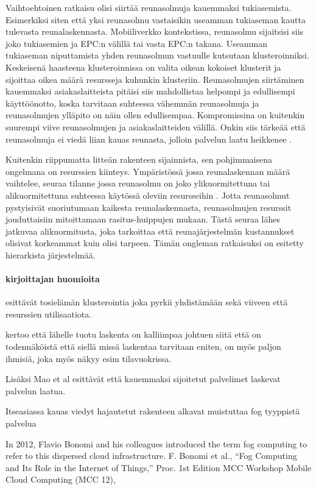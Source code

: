 Vaihtoehtoinen ratkaisu olisi siirtää reunasolmuja kauemmaksi tukiasemista. Esimerkiksi siten että yksi reunasolmu vastaisikin useamman tukiaseman kautta tulevasta reunalaskennasta. Mobiiliverkko kontekstissa, reunasolmu sijaitsisi siis joko tukiasemien ja EPC:n välillä tai vasta EPC:n takana.  
Useamman tukiaseman niputtamista yhden reunasolmun vastuulle kutsutaan klusteroinniksi. 
Keskeisenä haasteena klusteroinnissa on valita oikean kokoiset klusterit ja sijoittaa oikea määrä resursseja kuhunkin klusteriin.
Reunasolmujen siirtäminen kauemmaksi asiakaslaitteista pitäisi siis mahdollistaa helpompi ja edullisempi käyttöönotto, koska tarvitaan suhteessa vähemmän reunasolmuja ja reunasolmujen ylläpito on näin ollen edullisempaa.
Kompromissina on kuitenkin suurempi viive reunasolmujen ja asiakaslaitteiden välillä. 
Onkin siis tärkeää että reunasolmuja ei viedä liian kauas reunasta, jolloin palvelun laatu heikkenee \cite{mao17}. 

Kuitenkin riippumatta litteän rakenteen sijainnista, sen pohjimmaisena ongelmana on resurssien kiinteys. Ympäristössä jossa reunalaskennan määrä vaihtelee, seuraa tilanne jossa reunasolmu on joko ylikuormitettuna tai alikuormitettuna suhteessa käytössä oleviin resursseihin \cite{tong2016hierarchical}. Jotta reunasolmut pystyisivät suoriutumaan kaikesta reunalaskennasta, reunasolmujen resurssit jouduttaisiin mitoittamaan rasitus-huippujen mukaan. Tästä seuraa lähes jatkuvaa alikuormitusta, joka tarkoittaa että reunajärjestelmän kustannukset olisivat korkeammat kuin olisi tarpeen. 
Tämän ongleman ratkaisuksi on esitetty hierarkista järjestelmää.

\paragraph{kirjoittajan huomioita}
\begin{list}{•}{•}
\item \cite{malandrino2016close} esittävät tosielämän klusterointia joka pyrkii yhdistämään sekä viiveen että resurssien utilisaatiota. 
\item \cite{mao17} kertoo että lähelle tuotu laskenta on kalliimpaa johtuen siitä että on todennäköistä että siellä missä laskentaa tarvitaan eniten, on myös paljon ihmisiä, joka myös näkyy esim tilavuokrissa.
\item Lisäksi Mao et al esittävät että kauemmaksi sijoitetut palvelimet laskevat palvelun laatua. 
\item  Itseasiassa kauas viedyt hajautetut rakenteen alkavat muistuttaa fog tyyppistä palvelua
\item In 2012, Flavio Bonomi and his colleagues introduced the term fog computing to refer to this dispersed cloud infrastructure. F. Bonomi et al., “Fog Computing and
Its Role in the Internet of Things,”
Proc. 1st Edition MCC Workshop
Mobile Cloud Computing (MCC 12),
\end{list}

